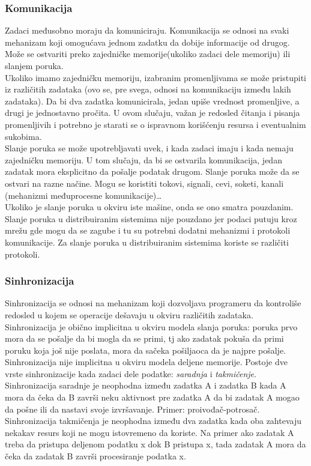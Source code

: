 \documentclass[../main.tex]{subfiles}
\begin{document}
\subsubsection{Komunikacija}								%

Zadaci međusobno moraju da komuniciraju. Komunikacija se odnosi na svaki mehanizam koji omogućava jednom zadatku da dobije informacije od drugog. Može se ostvariti preko zajedničke memorije(ukoliko zadaci dele memoriju) ili slanjem poruka.
\\
\indent Ukoliko imamo zajedničku memoriju, izabranim promenljivama se može pristupiti iz različitih zadataka (ovo se, pre svega, odnosi na komunikaciju između lakih zadataka). Da bi dva zadatka komunicirala, jedan upiše vrednost promenljive, a drugi je jednostavno pročita. U ovom slučaju, važan je redosled čitanja i pisanja promenljivih i potrebno je starati se o ispravnom korišćenju resursa i eventualnim sukobima.
\\
\indent Slanje poruka se može upotrebljavati uvek, i kada zadaci imaju i kada nemaju zajedničku memoriju. U tom slučaju, da bi se ostvarila komunikacija, jedan zadatak mora eksplicitno da pošalje podatak drugom. Slanje poruka može da se ostvari na razne načine. Mogu se koristiti tokovi, signali, cevi, soketi, kanali (mehanizmi međuprocesne komunikacije)\ldots
\\
Ukoliko je slanje poruka u okviru iste mašine, onda se ono smatra pouzdanim. Slanje poruka u distribuiranim sistemima nije pouzdano jer podaci putuju kroz mrežu gde mogu da se zagube i tu su potrebni dodatni mehanizmi i protokoli komunikacije. Za slanje poruka u distribuiranim sistemima koriste se različiti protokoli.

\subsubsection{Sinhronizacija} 								%
Sinhronizacija se odnosi na mehanizam koji dozvoljava programeru da kontroliše redosled u kojem se operacije dešavaju u okviru različitih zadataka. Sinhronizacija je obično implicitna u okviru modela slanja poruka: poruka prvo mora da se pošalje da bi mogla da se primi, tj ako zadatak pokuša da primi poruku koja još nije poslata, mora da sačeka pošiljaoca da je najpre pošalje. 
\\
Sinhronizacija nije implicitna u okviru modela deljene memorije. Postoje dve vrste sinhronizacije kada zadaci dele podatke: {\it saradnja} i {\it takmičenje}. Sinhronizacija saradnje je neophodna između zadatka A i zadatka B kada A mora da čeka da B završi neku aktivnost pre zadatka A da bi zadatak A mogao da pošne ili da nastavi svoje izvršavanje. Primer: proivođač-potrosač.
\\
Sinhronizacija takmičenja je neophodna između dva zadatka kada oba zahtevaju nekakav resurs koji ne mogu istovremeno da koriste. Na primer ako zadatak A treba da pristupa deljenom podatku x dok B pristupa x, tada zadatak A mora da čeka da zadatak B završi procesiranje podatka x.
\end{document}
